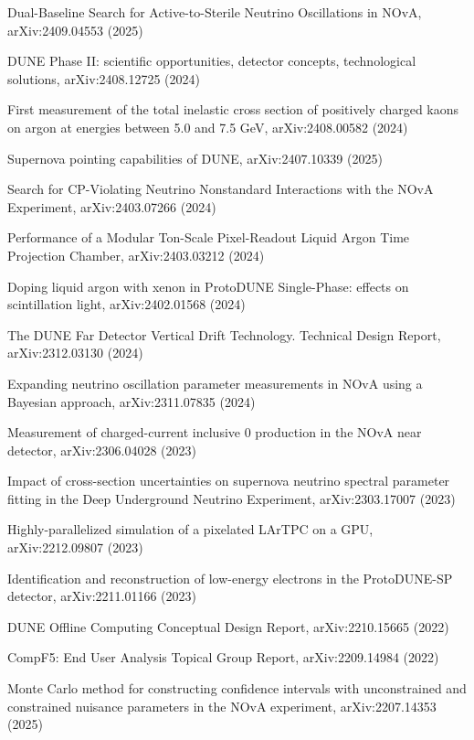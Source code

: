 \begin{list2}
\item Dual-Baseline Search for Active-to-Sterile Neutrino Oscillations in NOvA, arXiv:2409.04553 (2025) %
\item DUNE Phase II: scientific opportunities, detector concepts, technological solutions, arXiv:2408.12725 (2024) %
\item First measurement of the total inelastic cross section of positively charged kaons on argon at energies between 5.0 and 7.5 GeV, arXiv:2408.00582 (2024) %
\item Supernova pointing capabilities of DUNE, arXiv:2407.10339 (2025) %
\item Search for CP-Violating Neutrino Nonstandard Interactions with the NOvA Experiment, arXiv:2403.07266 (2024) %
\item Performance of a Modular Ton-Scale Pixel-Readout Liquid Argon Time Projection Chamber, arXiv:2403.03212 (2024) %
\item Doping liquid argon with xenon in ProtoDUNE Single-Phase: effects on scintillation light, arXiv:2402.01568 (2024) %
\item The DUNE Far Detector Vertical Drift Technology. Technical Design Report, arXiv:2312.03130 (2024) %
\item Expanding neutrino oscillation parameter measurements in NOvA using a Bayesian approach, arXiv:2311.07835 (2024) %
\item Measurement of charged-current inclusive 0 production in the NOvA near detector, arXiv:2306.04028 (2023) %
\item Impact of cross-section uncertainties on supernova neutrino spectral parameter fitting in the Deep Underground Neutrino Experiment, arXiv:2303.17007 (2023) %
\item Highly-parallelized simulation of a pixelated LArTPC on a GPU, arXiv:2212.09807 (2023) %
\item Identification and reconstruction of low-energy electrons in the ProtoDUNE-SP detector, arXiv:2211.01166 (2023) %
\item DUNE Offline Computing Conceptual Design Report, arXiv:2210.15665 (2022) %
\item CompF5: End User Analysis Topical Group Report, arXiv:2209.14984 (2022) %
\item Monte Carlo method for constructing confidence intervals with unconstrained and constrained nuisance parameters in the NOvA experiment, arXiv:2207.14353 (2025) %

\end{list2}
